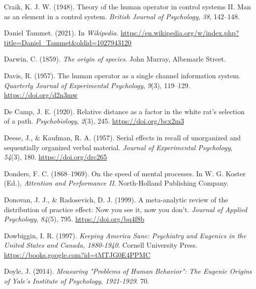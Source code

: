 \documentclass[
  oneside,
  12pt]{crumpbook}
\newlength{\cslhangindent}
\newlength{\cslentryspacingunit} %
\newenvironment{CSLReferences}[2] %
 {%
  \setlength{\parindent}{0pt}
  \ifodd #1
  \let\oldpar\par
  \def\par{\hangindent=\cslhangindent\oldpar}
  \fi
  \setlength{\parskip}{#2\cslentryspacingunit}
 }%
 {}
\begin{document}
\begin{CSLReferences}{1}{0}
\leavevmode{}%
Craik, K. J. W. (1948). Theory of the human operator in control systems {II}. {Man} as an element in a control system. \emph{British Journal of Psychology}, \emph{38}, 142--148.

\leavevmode{}%
Daniel {Tammet}. (2021). In \emph{Wikipedia}. \url{https://en.wikipedia.org/w/index.php?title=Daniel_Tammet\&oldid=1027943120}

\leavevmode{}%
Darwin, C. (1859). \emph{The origin of species}. {John Murray, Albemarle Street}.

\leavevmode{}%
Davis, R. (1957). The human operator as a single channel information system. \emph{Quarterly Journal of Experimental Psychology}, \emph{9}(3), 119--129. \url{https://doi.org/d2n3mw}

\leavevmode{}%
De Camp, J. E. (1920). Relative distance as a factor in the white rat's selection of a path. \emph{Psychobiology}, \emph{2}(3), 245. \url{https://doi.org/bcx2m3}

\leavevmode{}%
Deese, J., \& Kaufman, R. A. (1957). Serial effects in recall of unorganized and sequentially organized verbal material. \emph{Journal of Experimental Psychology}, \emph{54}(3), 180. \url{https://doi.org/drc265}

\leavevmode{}%
Donders, F. C. (1868--1969). On the speed of mental processes. In W. G. Koster (Ed.), \emph{Attention and {Performance II}}. {North-Holland Publishing Company}.

\leavevmode{}%
Donovan, J. J., \& Radosevich, D. J. (1999). A meta-analytic review of the distribution of practice effect: {Now} you see it, now you don't. \emph{Journal of Applied Psychology}, \emph{84}(5), 795. \url{https://doi.org/bq4f8b}

\leavevmode{}%
Dowbiggin, I. R. (1997). \emph{Keeping {America Sane}: {Psychiatry} and {Eugenics} in the {United States} and {Canada}, 1880-1940}. {Cornell University Press}. \url{https://books.google.com?id=tMTJG0E4PPMC}

\leavevmode{}%
Doyle, J. (2014). \emph{Measuring "{Problems} of {Human Behavior}": {The Eugenic Origins} of {Yale}'s {Institute} of {Psychology}, 1921-1929}. 70.


\end{CSLReferences}
\end{document}

